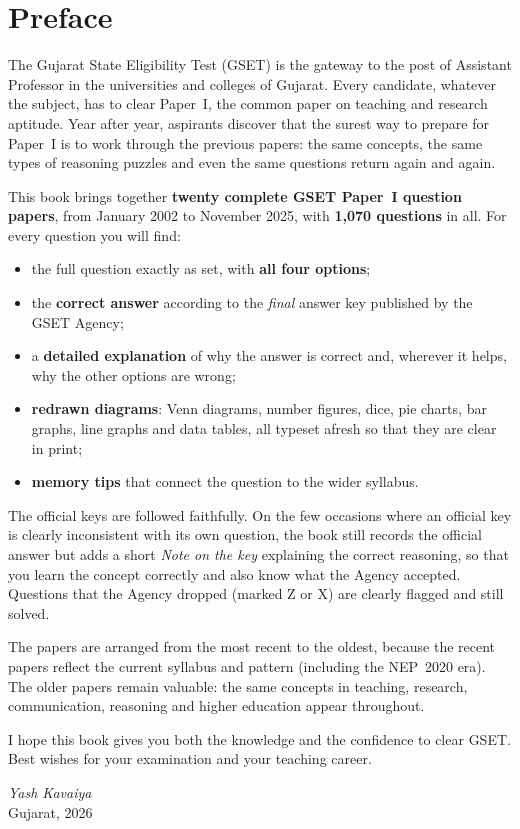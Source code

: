 \chapter*{Preface}

The Gujarat State Eligibility Test (GSET) is the gateway to the post of Assistant Professor in the universities and colleges of Gujarat. Every candidate, whatever the subject, has to clear Paper~I, the common paper on teaching and research aptitude. Year after year, aspirants discover that the surest way to prepare for Paper~I is to work through the previous papers: the same concepts, the same types of reasoning puzzles and even the same questions return again and again.

This book brings together \textbf{twenty complete GSET Paper~I question papers}, from January 2002 to November 2025, with \textbf{1{,}070 questions} in all. For every question you will find:
\begin{itemize}
\item the full question exactly as set, with \textbf{all four options};
\item the \textbf{correct answer} according to the \emph{final} answer key published by the GSET Agency;
\item a \textbf{detailed explanation} of why the answer is correct and, wherever it helps, why the other options are wrong;
\item \textbf{redrawn diagrams}: Venn diagrams, number figures, dice, pie charts, bar graphs, line graphs and data tables, all typeset afresh so that they are clear in print;
\item \textbf{memory tips} that connect the question to the wider syllabus.
\end{itemize}

The official keys are followed faithfully. On the few occasions where an official key is clearly inconsistent with its own question, the book still records the official answer but adds a short \emph{Note on the key} explaining the correct reasoning, so that you learn the concept correctly and also know what the Agency accepted. Questions that the Agency dropped (marked Z or X) are clearly flagged and still solved.

The papers are arranged from the most recent to the oldest, because the recent papers reflect the current syllabus and pattern (including the NEP~2020 era). The older papers remain valuable: the same concepts in teaching, research, communication, reasoning and higher education appear throughout.

I hope this book gives you both the knowledge and the confidence to clear GSET. Best wishes for your examination and your teaching career.

\bigskip
\hfill\textit{Yash Kavaiya}\\
\hspace*{\fill}Gujarat, 2026
